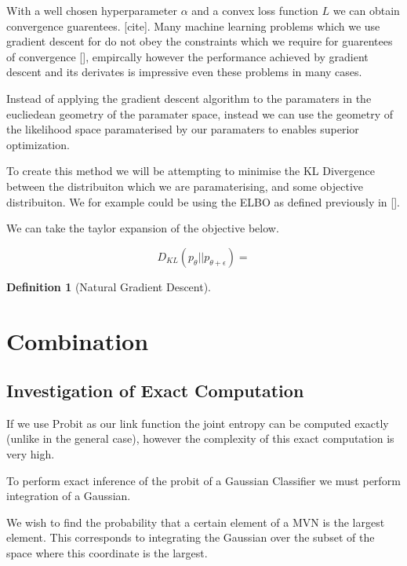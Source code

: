 \documentclass[12pt, a4paper]{report}
\theoremstyle{definition}
\newtheorem{definition}{Definition}[section]
\begin{document}
With a well chosen hyperparameter $\alpha$ and a convex loss function $L$ we can obtain convergence guarentees. [cite]. Many machine learning problems which we use gradient descent for do not obey the constraints which we require for guarentees of convergence [], empircally however the performance achieved by gradient descent and its derivates is impressive even these problems in many cases.

Instead of applying the gradient descent algorithm to the paramaters in the eucliedean geometry of the paramater space, instead we can use the geometry of the likelihood space paramaterised by our paramaters to enables superior optimization.

To create this method we will be attempting to minimise the KL Divergence between the distribuiton which we are paramaterising, and some objective distribuiton. We for example could be using the ELBO as defined previously in [].


We can take the taylor expansion of the objective below.

$$D_{KL} \left(p_\theta || p_{\theta+ \epsilon} \right) = $$




\begin{definition}[Natural Gradient Descent]
    
\end{definition}









\chapter{Combination}
\label{Chap5}

\section{Investigation of Exact Computation}

\label{sec:Integration}

If we use Probit as our link function the joint entropy can be computed exactly (unlike in the general case), however the complexity of this exact computation is very high.

To perform exact inference of the probit of a Gaussian Classifier we must perform integration of a Gaussian.

We wish to find the probability that a certain element of a MVN is the largest element. This corresponds to integrating the Gaussian over the subset of the space where this coordinate is the largest.
\end{document}
